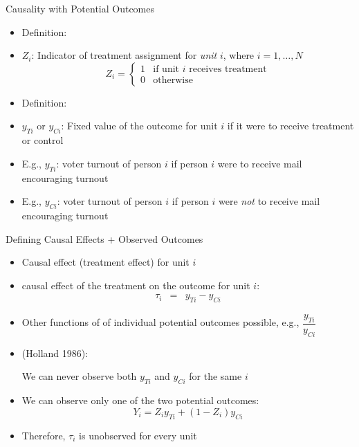 \documentclass[table, xcolor = {dvipsnames}, 9pt]{beamer}
\theoremstyle{plain}
\newcommand{\bh}[1]{{\color{blue}{#1}}}
\newcommand{\mh}[1]{{\color{magenta}{#1}}}
\begin{document}
\begin{frame}{Causality with Potential Outcomes}
  \begin{itemize}
  \item Definition: \bh{Treatment}
  \item[] $Z_i$: Indicator of treatment assignment for {\em unit} $i$, where $i = 1, \ldots, N$
    \[
      Z_i = \left\{
        \begin{array}{ll}
          1 & \mbox{if unit $i$ receives treatment}\\
          0 & \mbox{otherwise}
        \end{array}
      \right.
    \]
\pause
  \item Definition: \bh{Potential Outcomes}
  \item[] \indent $y_{Ti}$ or $y_{Ci}$: Fixed value of the outcome for unit $i$ if it were to receive treatment or control
  \item[] E.g., $y_{Ti}$: voter turnout of person $i$ if person $i$ were to receive mail encouraging turnout
  \item[] E.g., $y_{Ci}$: voter turnout of person $i$ if person $i$ were \textit{not} to receive mail encouraging turnout
  \end{itemize}
\end{frame}
\begin{frame}{Defining Causal Effects + Observed Outcomes}
\begin{itemize}
\item Causal effect (treatment effect) for unit $i$
\item[] \mh{Additive} causal effect of the treatment on the outcome for unit $i$:
\begin{eqnarray*}
\tau_i & = & y_{Ti} - y_{Ci}
\end{eqnarray*}
\item Other functions of of individual potential outcomes possible, e.g., $\dfrac{y_{Ti}}{y_{Ci}}$ \pause
\item \mh{Fundamental Problem of Causal Inference} (Holland 1986):
  \begin{center}
    We can never observe both $y_{Ti}$ and $y_{Ci}$ for the same $i$\\
  \end{center} 
\item We can observe only one of the two potential outcomes:
  $$ Y_i = Z_i y_{Ti} + (1 - Z_i)y_{Ci}$$
\item Therefore, $\tau_{i}$ is unobserved for every unit
\end{itemize}
\end{frame}
\end{document}

